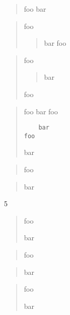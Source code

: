 
\def\mytitle{Blockquotes}


\begin{quote}
foo
bar
\end{quote}

\begin{quote}
foo

\begin{quote}
bar
foo
\end{quote}
\end{quote}

\begin{quote}
foo

\begin{quote}
bar
\end{quote}

foo
\end{quote}

\begin{quote}
foo
bar
 foo

\begin{verbatim}
	bar
foo
\end{verbatim}

bar
\end{quote}

\begin{quote}
foo
\end{quote}

\begin{quote}
bar
\end{quote}

5

\begin{quote}
foo

bar
\end{quote}

\begin{quote}
foo
\end{quote}

\begin{quote}
bar
\end{quote}

\begin{quote}
foo

bar
\end{quote}



